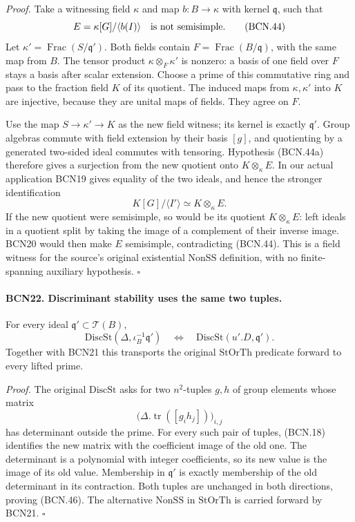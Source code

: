 \emph{Proof.}
Take a witnessing field \(\kappa\) and map \(b:B\to\kappa\)
with kernel \(\mathfrak q\), such that
\[
 E=\kappa[G]/\langle b(I)\rangle
 \quad\hbox{is not semisimple}.                                \tag{BCN.44}
\]
Let \(\kappa'=\operatorname{Frac}(S/\mathfrak q')\).
Both fields contain
\(F=\operatorname{Frac}(B/\mathfrak q)\), with the same
map from \(B\).  The tensor product
\(\kappa\otimes_F\kappa'\) is nonzero: a basis of one
field over \(F\) stays a basis after scalar extension.
Choose a prime of this commutative ring and pass to the
fraction field \(K\) of its quotient.  The induced maps
from \(\kappa,\kappa'\) into \(K\) are injective, because
they are unital maps of fields.  They agree on \(F\).

Use the map \(S\to\kappa'\to K\) as the new field witness;
its kernel is exactly \(\mathfrak q'\).
Group algebras commute with field extension by their
basis \([g]\), and quotienting by a generated two-sided
ideal commutes with tensoring.  Hypothesis (BCN.44a)
therefore gives a surjection from the new quotient onto
\(K\otimes_\kappa E\).  In our actual application BCN19
gives equality of the two ideals, and hence the stronger
identification
\[
 K[G]/\langle I'\rangle
 \simeq K\otimes_\kappa E .                                    \tag{BCN.45}
\]
If the new quotient were semisimple, so would be its
quotient \(K\otimes_\kappa E\): left ideals in a quotient
split by taking the image of a complement of their inverse
image.  BCN20 would then make \(E\) semisimple,
contradicting (BCN.44).
This is a field witness for the source's original
existential \(\mathrm{NonSS}\) definition, with no
finite-spanning auxiliary hypothesis.
\hfill\(\square\)

\paragraph{BCN22. Discriminant stability uses the same two tuples.}\label{claim:BCN22}
For every ideal \(\mathfrak q'\subset\mathscr T(B)\),
\[
 \mathrm{DiscSt}(\Delta,\iota_B^{-1}\mathfrak q')
 \quad\Longleftrightarrow\quad
 \mathrm{DiscSt}(u'.D,\mathfrak q').
                                                               \tag{BCN.46}
\]
Together with BCN21 this transports the original
\(\mathrm{StOrTh}\) predicate forward to every lifted prime.

\emph{Proof.}
The original \(\mathrm{DiscSt}\) asks for two
\(n^2\)-tuples \(g,h\) of group elements whose matrix
\[
 \big(\Delta.\operatorname{tr}([g_i h_j])\big)_{i,j}
\]
has determinant outside the prime.
For every such pair of tuples, (BCN.18) identifies the new matrix
with the coefficient image of the old one.
The determinant is a polynomial with integer coefficients,
so its new value is the image of its old value.
Membership in \(\mathfrak q'\) is exactly membership
of the old determinant in its contraction.
Both tuples are unchanged in both directions, proving
(BCN.46).  The alternative \(\mathrm{NonSS}\) in
\(\mathrm{StOrTh}\) is carried forward by BCN21.
\hfill\(\square\)

